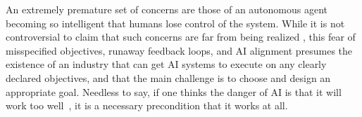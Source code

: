 \documentclass[acmconf,manuscript,screen,natbib=true]{acmart}
\begin{document}
An extremely premature set of concerns are those of an autonomous agent becoming so intelligent that humans lose control of the system. While it is not controversial to claim that such concerns are far from being realized %
\cite{crawford2016artificial, atkinson2018going, prunkl2020beyond}, this fear of misspecified objectives, runaway feedback loops, and AI alignment presumes the existence of an industry that can get AI systems to execute on any clearly declared objectives, and that the main challenge is to choose and design an appropriate goal. %
Needless to say, if one thinks the danger of AI is that it will work too well~\cite{shane2019janelle}, it is a necessary precondition that it works at all.
\end{document}
